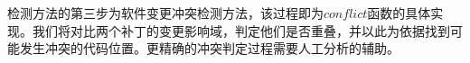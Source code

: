 %
%
%
%
%
%
%
%


检测方法的第三步为软件变更冲突检测方法，该过程即为$conflict$函数的具体实现。我们将对比两个补丁的变更影响域，判定他们是否重叠，并以此为依据找到可能发生冲突的代码位置。更精确的冲突判定过程需要人工分析的辅助。

